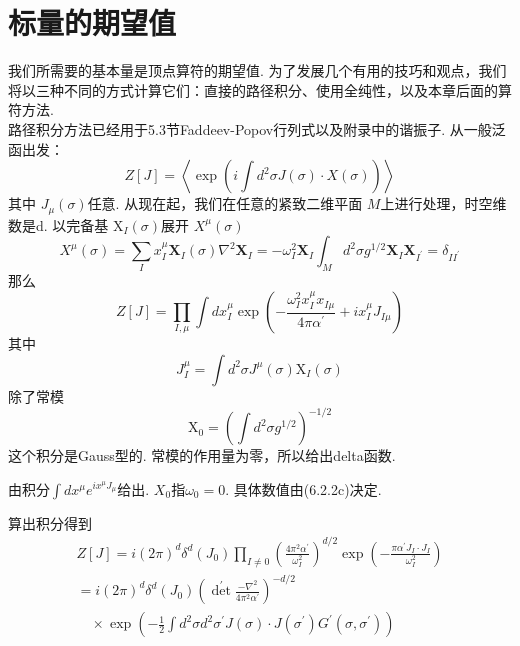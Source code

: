 \section{标量的期望值}%
我们所需要的基本量是顶点算符的期望值. 为了发展几个有用的技巧和观点，我们将以三种不同的方式计算它们：直接的路径积分、使用全纯性，以及本章后面的算符方法.\\
路径积分方法已经用于5.3节Faddeev-Popov行列式以及附录中的谐振子. 从一般泛函出发：
\begin{equation}
	Z[J]=\left\langle\exp \left(i \int d^{2} \sigma J(\sigma) \cdot X(\sigma)\right)\right\rangle
\end{equation}
其中 $J_{\mu}(\sigma) $任意. 从现在起，我们在任意的紧致二维平面 $M$上进行处理，时空维数是d. 以完备基 $\mathrm{X}_{I}(\sigma)$展开 $X^{\mu}(\sigma)$ 
\begin{subequations}
\begin{equation}
X^{\mu}(\sigma) =\sum_{I} x_{I}^{\mu} \mathbf{X}_{I}(\sigma)
\end{equation}
\begin{equation}
\nabla^{2} \mathbf{X}_{I} =-\omega_{I}^{2} \mathbf{X}_{I}
\end{equation}
\begin{equation}
\int_{M} d^{2} \sigma g^{1 / 2} \mathbf{X}_{I} \mathbf{X}_{I^{\prime}} =\delta_{I I^{\prime}}
\end{equation}	
\end{subequations}
那么
\begin{equation}
	Z[J]=\prod_{I, \mu} \int d x_{I}^{\mu} \exp \left(-\frac{\omega_{I}^{2} x_{I}^{\mu} x_{I \mu}}{4 \pi \alpha^{\prime}}+i x_{I}^{\mu} J_{I \mu}\right)
\end{equation}
其中
\begin{equation}
	J_{I}^{\mu}=\int d^{2} \sigma J^{\mu}(\sigma) \mathrm{X}_{I}(\sigma)
\end{equation}
除了常模
\begin{equation}
	\mathrm{X}_{0}=\left(\int d^{2} \sigma g^{1 / 2}\right)^{-1 / 2}
\end{equation}
这个积分是Gauss型的. 常模的作用量为零，所以给出delta函数. \\
\begin{remark}
由积分$\int d x^{\mu} e^{ i x^{\mu}J_{\mu}}$给出. $X_0$指$\omega_0=0$. 具体数值由(6.2.2c)决定.
\end{remark}
算出积分得到
\begin{equation}
	\begin{aligned}
		Z[J]=i(2 \pi)^{d} \delta^{d}\left(J_{0}\right) \prod_{I \neq 0}\left(\frac{4 \pi^{2} \alpha^{\prime}}{\omega_{I}^{2}}\right)^{d / 2} \exp \left(-\frac{\pi \alpha^{\prime} J_{I} \cdot J_{I}}{\omega_{I}^{2}}\right) \\
		=i(2 \pi)^{d} \delta^{d}\left(J_{0}\right)\left(\operatorname{det}^{\prime} \frac{-\nabla^{2}}{4 \pi^{2} \alpha^{\prime}}\right)^{-d / 2} \\
		\quad \times \exp \left(-\frac{1}{2} \int d^{2} \sigma d^{2} \sigma^{\prime} J(\sigma) \cdot J\left(\sigma^{\prime}\right) G^{\prime}\left(\sigma, \sigma^{\prime}\right)\right)
	\end{aligned}
\end{equation}
